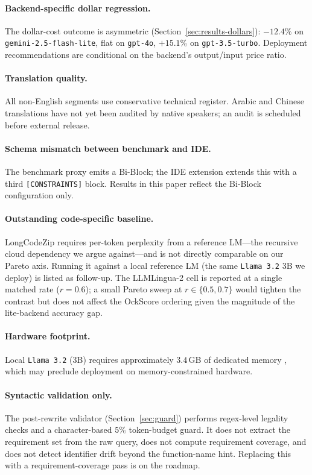 \documentclass[11pt,a4paper,twocolumn]{article}
\begin{document}
\paragraph{Backend-specific dollar regression.} The dollar-cost outcome is asymmetric (Section~\ref{sec:results-dollars}): $-12.4\%$ on \texttt{gemini-2.5-flash-lite}, flat on \texttt{gpt-4o}, $+15.1\%$ on \texttt{gpt-3.5-turbo}. Deployment recommendations are conditional on the backend's output/input price ratio.

\paragraph{Translation quality.} All non-English segments use conservative technical register. Arabic and Chinese translations have not yet been audited by native speakers; an audit is scheduled before external release.

\paragraph{Schema mismatch between benchmark and IDE.} The benchmark proxy emits a Bi-Block; the IDE extension extends this with a third \texttt{[CONSTRAINTS]} block. Results in this paper reflect the Bi-Block configuration only.

\paragraph{Outstanding code-specific baseline.} LongCodeZip \cite{shi2025longcodezip} requires per-token perplexity from a reference LM---the recursive cloud dependency we argue against---and is not directly comparable on our Pareto axis. Running it against a local reference LM (the same \texttt{Llama 3.2} 3B we deploy) is listed as follow-up. The LLMLingua-2 cell is reported at a single matched rate ($r{=}0.6$); a small Pareto sweep at $r \in \{0.5, 0.7\}$ would tighten the contrast but does not affect the OckScore ordering given the magnitude of the lite-backend accuracy gap.

\paragraph{Hardware footprint.} Local \texttt{Llama 3.2} (3B) requires approximately $3.4$\,GB of dedicated memory \cite{meta2024llama32}, which may preclude deployment on memory-constrained hardware.

\paragraph{Syntactic validation only.} The post-rewrite validator (Section~\ref{sec:guard}) performs regex-level legality checks and a character-based $5\%$ token-budget guard. It does not extract the requirement set from the raw query, does not compute requirement coverage, and does not detect identifier drift beyond the function-name hint. Replacing this with a requirement-coverage pass is on the roadmap.
\end{document}
